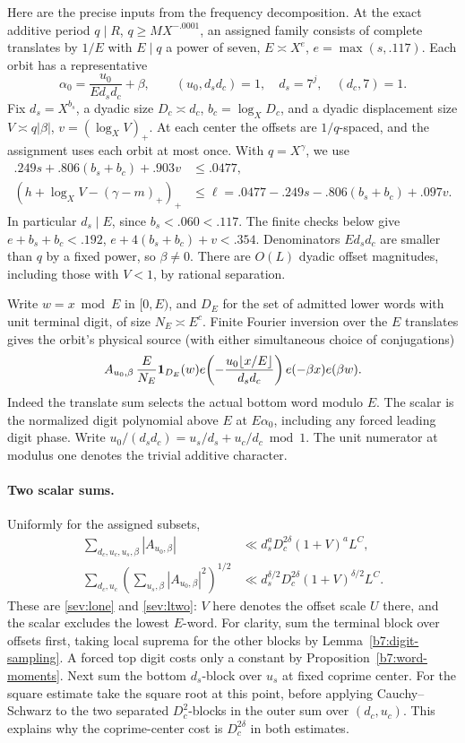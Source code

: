 \documentclass[11pt,a4paper]{article}
\theoremstyle{paperplain}
\numberwithin{equation}{section}
\begin{document}
Here are the precise inputs from the frequency decomposition. At the
exact additive period \(q\mid R\), \(q\ge MX^{-.0001}\),
an assigned family consists of complete translates by \(1/E\) with
\(E\mid q\) a power of seven, \(E\asymp X^e\), \(e=\max(s,.117)\).
Each orbit has a representative
\[
 \alpha_0=\frac{u_0}{E d_s d_c}+\beta,\qquad
 (u_0,d_s d_c)=1,\quad d_s=7^j,\quad (d_c,7)=1 .
\]
Fix \(d_s=X^{b_s}\), a dyadic size \(D_c\asymp d_c\), \(b_c=\log_XD_c\),
and a dyadic displacement size \(V\asymp q|\beta|\), \(v=(\log_X V)_+\).
At each center the offsets are \(1/q\)-spaced, and the assignment
uses each orbit at most once. With \(q=X^\gamma\), we use
\begin{align*}
 .249s+.806(b_s+b_c)+.903v&\le .0477,\\
 (h+\log_X V-(\gamma-m)_+)_+&\le
 \ell=.0477-.249s-.806(b_s+b_c)+.097v.
\end{align*}
In particular \(d_s\mid E\), since \(b_s<.060<.117\).
The finite checks below give \(e+b_s+b_c<.192\),
\(e+4(b_s+b_c)+v<.354\). Denominators \(E d_s d_c\) are smaller than
\(q\) by a fixed power, so \(\beta\ne0\). There are \(O(L)\) dyadic
offset magnitudes, including those with \(V<1\), by rational separation.

Write \(w=x\bmod E\) in \([0,E)\), and \(D_E\) for the set of
admitted lower words with unit terminal digit, of size \(N_E\asymp E^c\).
Finite Fourier inversion over the \(E\) translates gives the orbit's
physical source (with either simultaneous choice of conjugations)
\[
 A_{u_0,\beta}\,\frac{E}{N_E}{\bf1}_{D_E}(w)
 e\!\left(-\frac{u_0\lfloor x/E\rfloor}{d_sd_c}\right)
 e(-\beta x)e(\beta w).
\]
Indeed the translate sum selects the actual bottom word modulo \(E\).
The scalar is the normalized digit polynomial above \(E\) at \(E\alpha_0\),
including any forced leading digit phase. Write
\(u_0/(d_sd_c)=u_s/d_s+u_c/d_c\bmod 1\). The unit numerator at
modulus one denotes the trivial additive character.

\paragraph{Two scalar sums.}
Uniformly for the assigned subsets,
\begin{align}
 \sum_{d_c,u_c,u_s,\beta}|A_{u_0,\beta}|
 &\ll d_s^aD_c^{2\delta}(1+V)^a L^C,\label{seven-orb-lone}\\
 \sum_{d_c,u_c}\left(\sum_{u_s,\beta}|A_{u_0,\beta}|^2\right)^{1/2}
 &\ll d_s^{\delta/2}D_c^{2\delta}(1+V)^{\delta/2}L^C .
 \label{seven-orb-ltwo}
\end{align}
These are \eqref{sev:lone} and \eqref{sev:ltwo}: $V$ here denotes the
offset scale $U$ there, and the scalar excludes the lowest $E$-word.
For clarity, sum the terminal block over offsets first, taking local
suprema for the other blocks by Lemma~\ref{b7:digit-sampling}.
A forced top digit costs only a constant by Proposition~\ref{b7:word-moments}.
Next sum the bottom $d_s$-block over $u_s$ at fixed coprime center.
For the square estimate take the square root at this point, before
applying Cauchy--Schwarz to the two separated $D_c^2$-blocks in the
outer sum over $(d_c,u_c)$. This explains why the coprime-center cost
is $D_c^{2\delta}$ in both estimates.
\end{document}
